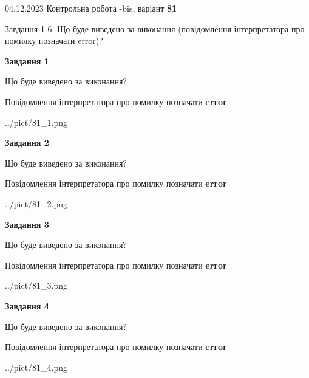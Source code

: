 \documentclass[12pt, ukrainian]{article}
\begin{document}
{{04.12.2023 Контрольна робота -bis, варіант  \No \textbf { 81 }\par}}
{

Завдання 1-6: Що буде виведено за виконання (повідомлення інтерпретатора про помилку позначати error)?


{\begin {center}\textbf{Завдання 1}\end {center}}\par
Що буде виведено за виконання? \par
Повідомлення інтерпретатора про помилку позначати \textbf{error}

\begin{center}
	{../pict/81_1.png}
\end{center}
\newpage

{\begin {center}\textbf{Завдання 2}\end {center}}\par
Що буде виведено за виконання? \par
Повідомлення інтерпретатора про помилку позначати \textbf{error}

\begin{center}
	{../pict/81_2.png}
\end{center}
\newpage

{\begin {center}\textbf{Завдання 3}\end {center}}\par
Що буде виведено за виконання? \par
Повідомлення інтерпретатора про помилку позначати \textbf{error}

\begin{center}
	{../pict/81_3.png}
\end{center}
\newpage

{\begin {center}\textbf{Завдання 4}\end {center}}\par
Що буде виведено за виконання? \par
Повідомлення інтерпретатора про помилку позначати \textbf{error}

\begin{center}
	{../pict/81_4.png}
\end{center}
\newpage

}
\end{document}
